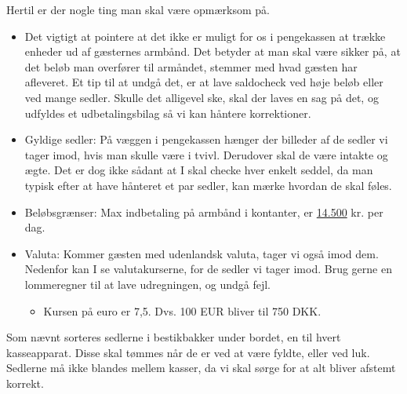 Hertil er der nogle ting man skal være opmærksom på.
\begin{itemize}
  \item Det vigtigt at pointere at det ikke er muligt for 
  os i pengekassen at trække enheder ud af gæsternes armbånd.
  Det betyder at man skal være sikker på, at det beløb man overfører til armåndet, 
  stemmer med hvad gæsten har afleveret. Et tip til at undgå det, er
  at lave saldocheck ved høje beløb eller ved mange sedler.
  Skulle det alligevel ske, skal der laves en sag på det, og udfyldes et
  udbetalingsbilag så vi kan håntere korrektioner.
  \item Gyldige sedler: På væggen i pengekassen hænger der billeder af de sedler vi tager imod, 
  hvis man skulle være i tvivl. Derudover skal de være intakte og ægte. 
  Det er dog ikke sådant at I skal checke hver enkelt seddel, da man typisk efter at have 
  hånteret et par sedler, kan mærke hvordan de skal føles.
  \item Beløbsgrænser: Max indbetaling på armbånd i kontanter, er \underline{14.500} kr. per dag. 
  \item Valuta: Kommer gæsten med udenlandsk valuta, tager vi også imod dem. Nedenfor 
  kan I se valutakurserne, for de sedler vi tager imod. Brug gerne en lommeregner til 
  at lave udregningen, og undgå fejl.
  \begin{itemize}
    \item Kursen på euro er 7,5. Dvs. 100 EUR bliver til 750 DKK.
  \end{itemize}
\end{itemize}

Som nævnt sorteres sedlerne i bestikbakker under bordet, en til hvert kasseapparat. 
Disse skal tømmes når de er ved at være fyldte, eller ved luk. Sedlerne må ikke blandes mellem kasser, 
da vi skal sørge for at alt bliver afstemt korrekt.

